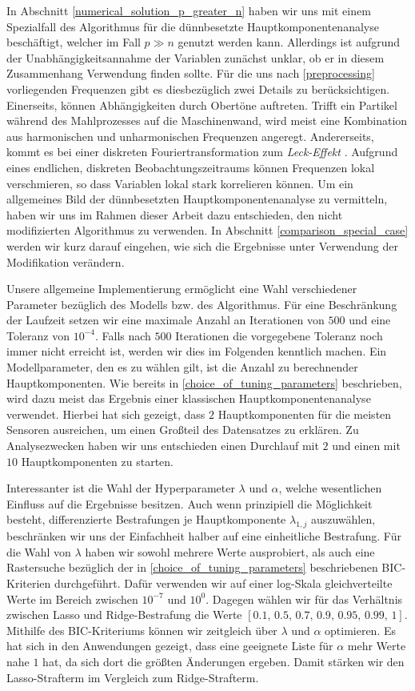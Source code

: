 In Abschnitt \ref{numerical_solution_p_greater_n} haben wir uns mit einem Spezialfall des Algorithmus für die dünnbesetzte Hauptkomponentenanalyse beschäftigt, welcher im Fall $p \gg n$ genutzt werden kann. Allerdings ist aufgrund der Unabhängigkeitsannahme der Variablen zunächst unklar, ob er in diesem Zusammenhang Verwendung finden sollte. Für die uns nach \ref{preprocessing} vorliegenden Frequenzen gibt es diesbezüglich zwei Details zu berücksichtigen. Einerseits, können Abhängigkeiten durch Obertöne auftreten. Trifft ein Partikel während des Mahlprozesses auf die Maschinenwand, wird meist eine Kombination aus harmonischen und unharmonischen Frequenzen angeregt. Andererseits, kommt es bei einer diskreten Fouriertransformation zum \textit{Leck-Effekt} \cite{kiencke}. Aufgrund eines endlichen, diskreten Beobachtungszeitraums können Frequenzen lokal verschmieren, so dass Variablen lokal stark korrelieren können. Um ein allgemeines Bild der dünnbesetzten Hauptkomponentenanalyse zu vermitteln, haben wir uns im Rahmen dieser Arbeit dazu entschieden, den nicht modifizierten Algorithmus zu verwenden. In Abschnitt \ref{comparison_special_case} werden wir kurz darauf eingehen, wie sich die Ergebnisse unter Verwendung der Modifikation verändern.

Unsere allgemeine Implementierung ermöglicht eine Wahl verschiedener Parameter bezüglich des Modells bzw. des Algorithmus. Für eine Beschränkung der Laufzeit setzen wir eine maximale Anzahl an Iterationen von $500$ und eine Toleranz von $10^{-4}$. Falls nach $500$ Iterationen die vorgegebene Toleranz noch immer nicht erreicht ist, werden wir dies im Folgenden kenntlich machen. Ein Modellparameter, den es zu wählen gilt, ist die Anzahl zu berechnender Hauptkomponenten. Wie bereits in \ref{choice_of_tuning_parameters} beschrieben, wird dazu meist das Ergebnis einer klassischen Hauptkomponentenanalyse verwendet. Hierbei hat sich gezeigt, dass $2$ Hauptkomponenten für die meisten Sensoren ausreichen, um einen Großteil des Datensatzes zu erklären. Zu Analysezwecken haben wir uns entschieden einen Durchlauf mit $2$ und einen mit $10$ Hauptkomponenten zu starten. 

Interessanter ist die Wahl der Hyperparameter $\lambda$ und $\alpha$, welche wesentlichen Einfluss auf die Ergebnisse besitzen. Auch wenn prinzipiell die Möglichkeit besteht, differenzierte Bestrafungen je Hauptkomponente $\lambda_{1,j}$ auszuwählen, beschränken wir uns der Einfachheit halber auf eine einheitliche Bestrafung. Für die Wahl von $\lambda$ haben wir sowohl mehrere Werte ausprobiert, als auch eine Rastersuche bezüglich der in \ref{choice_of_tuning_parameters} beschriebenen BIC-Kriterien durchgeführt. Dafür verwenden wir auf einer log-Skala gleichverteilte Werte im Bereich zwischen $10^{-7}$ und $10^0$. Dagegen wählen wir für das Verhältnis zwischen Lasso und Ridge-Bestrafung die Werte $[0.1,\, 0.5,\, 0.7,\, 0.9,\, 0.95,\, 0.99,\, 1]$. Mithilfe des BIC-Kriteriums können wir zeitgleich über $\lambda$ und $\alpha$ optimieren. Es hat sich in den Anwendungen gezeigt, dass eine geeignete Liste für $\alpha$ mehr Werte nahe $1$ hat, da sich dort die größten Änderungen ergeben. Damit stärken wir den Lasso-Strafterm im Vergleich zum Ridge-Strafterm.  


